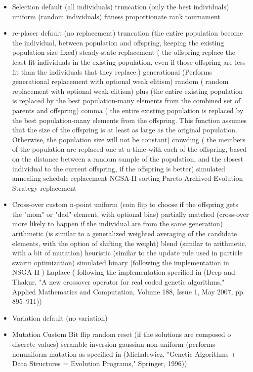 \documentclass{article}
\begin{document}
	\begin{itemize}
		\item  Selection
		\subitem default  (all individuals)
		\subitem truncation (only the best individuals)
		\subitem uniform (random individuals)
		\subitem fitness proportionate
		\subitem rank
		\subitem tournament
		\item re-placer 
		\subitem default  (no replacement)
		\subitem truncation (the entire population become the individual, between population and offspring,  keeping the existing population size fixed)
		\subitem steady-state replacement ( the offspring replace the least fit individuals in the existing
		population, even if those offspring are less fit than the individuals
		that they replace.)
		\subitem generational (Performs generational replacement with optional weak elitism)
		\subitem random ( random replacement with optional weak elitism)
		\subitem plus (the entire existing population is replaced by the best population-many elements from the combined set of parents and offspring)
		\subitem comma ( the entire existing population is replaced by the best population-many elements from the offspring. This function assumes that the size of the offspring is at least as large as the original population. Otherwise, the    population size will not be constant)
		\subitem crowding (  the members of the population are replaced one-at-a-time with each of the offspring, based on the distance between a random sample of the population, and the closest individual to the current offspring, if the offspring is better)
		\subitem simulated annealing schedule replacement
		\subitem NGSA-II sorting
		\subitem  Pareto Archived Evolution Strategy replacement
		\item Cross-over
		\subitem custom
		\subitem n-point
		\subitem uniform (coin flip to choose if the offspring gets the "mom" or "dad" element, with optional bias)
		\subitem partially matched (cross-over more likely to happen if the individual are from the same generation)
		\subitem arithmetic (is similar to a generalized weighted averaging of the candidate elements, with the option of shifting the weight)
		\subitem blend (similar to arithmetic, with a bit of mutation)
		\subitem heuristic (similar to the update rule used in particle swarm optimization)
		\subitem simulated binary (following the implementation in NSGA-II )
		\subitem Laplace ( following the implementation specified in (Deep and Thakur, "A new crossover operator for real coded genetic algorithms," Applied Mathematics and Computation, Volume 188, Issue 1, May 2007, pp. 895--911))
		\item Variation
		\subitem default (no variation)
		\item Mutation 
		\subitem Custom
		\subitem Bit flip
		\subitem random reset (if the solutions are composed o discrete values)
		\subitem scramble
		\subitem inversion
		\subitem gaussian
		\subitem non-uniform (performs nonuniform mutation as specified in (Michalewicz, "Genetic Algorithms
		+ Data Structures = Evolution Programs," Springer, 1996))
		
	\end{itemize}
\end{document}
